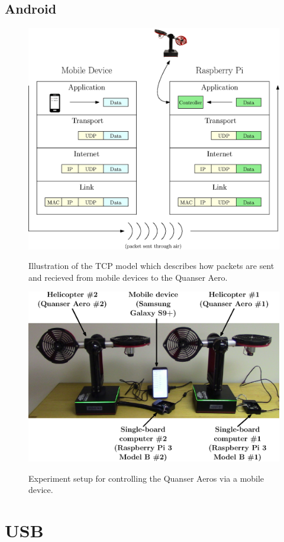 \subsection{Android}
\begin{figure}[!htbp]
    \centering
    \includegraphics[width=.46\textwidth,keepaspectratio=true]{figs/ipe/TCPModel.eps}
    \label{fig:TCPModel}
    \caption{Illustration of the TCP model which describes how packets are sent and recieved from mobile devices to the Quanser Aero.}
\end{figure}


\begin{figure}[!htbp]
    \centering
    \includegraphics[width=.5\textwidth,keepaspectratio=true]{figs/ipe/Setup.eps}
    \label{fig:Setup}
    \caption{Experiment setup for controlling the Quanser Aeros via a mobile device.}
\end{figure}

\section{USB}
